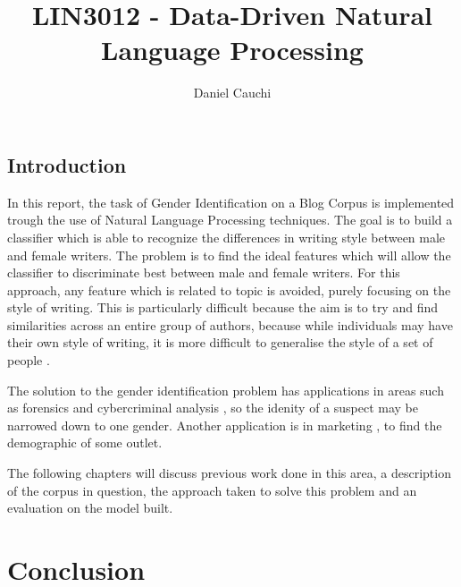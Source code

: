 \documentclass{article}
\begin{document}
\title{LIN3012 - Data-Driven Natural Language Processing}
\author{Daniel Cauchi}
\date{}
\maketitle


\section{Introduction}
In this report, the task of Gender Identification on a Blog Corpus is implemented trough the use of Natural Language Processing techniques. The goal is to build a classifier which is able to recognize the differences in writing style between male and female writers. The problem is to find the ideal features which will allow the classifier to discriminate best between male and female writers. For this approach, any feature which is related to topic is avoided, purely focusing on the style of writing. This is particularly difficult because the aim is to try and find similarities across an entire group of authors, because while individuals may have their own style of writing, it is more difficult to generalise the style of a set of people \cite{3}.


The solution to the gender identification problem has applications in areas such as forensics \cite{2, 6} and cybercriminal analysis \cite{1}, so the idenity of a suspect may be narrowed down to one gender. Another application is in marketing \cite{6}, to find the demographic of some outlet.

The following chapters will discuss previous work done in this area, a description of the corpus in question, the approach taken to solve this problem and an evaluation on the model built.



\chapter{Conclusion}





%
\end{document}
